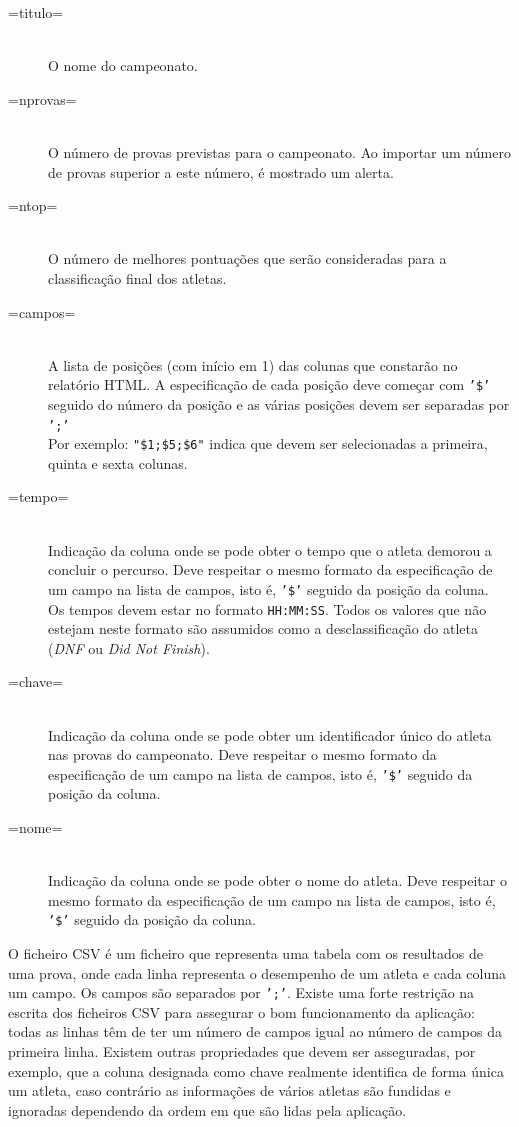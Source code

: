\documentclass[11pt, a4paper, oneside]{article}
\begin{document}
\begin{description}
\item[=titulo=] \hfill \\
	O nome do campeonato.
\item[=nprovas=] \hfill \\
	O número de provas previstas para o campeonato. Ao importar um número de provas superior a este número, é mostrado um alerta.
\item[=ntop=] \hfill \\
	O número de melhores pontuações que serão consideradas para a classificação final dos atletas.
\item[=campos=] \hfill \\
	A lista de posições (com início em 1) das colunas que constarão no relatório HTML. A especificação de cada posição deve começar com \texttt{'\$'} seguido do número da posição e as várias posições devem ser separadas por \texttt{';'}\\
	Por exemplo: \texttt{"\$1;\$5;\$6"} indica que devem ser selecionadas a primeira, quinta e sexta colunas.
\item[=tempo=] \hfill \\
	Indicação da coluna onde se pode obter o tempo que o atleta demorou a concluir o percurso. Deve respeitar o mesmo formato da especificação de um campo na lista de campos, isto é, \texttt{'\$'} seguido da posição da coluna.\\
	Os tempos devem estar no formato \texttt{HH:MM:SS}. Todos os valores que não estejam neste formato são assumidos como a desclassificação do atleta (\emph{DNF} ou \emph{Did Not Finish}).
\item[=chave=] \hfill \\
	Indicação da coluna onde se pode obter um identificador único do atleta nas provas do campeonato. Deve respeitar o mesmo formato da especificação de um campo na lista de campos, isto é, \texttt{'\$'} seguido da posição da coluna.
\item[=nome=] \hfill \\
	Indicação da coluna onde se pode obter o nome do atleta. Deve respeitar o mesmo formato da especificação de um campo na lista de campos, isto é, \texttt{'\$'} seguido da posição da coluna.
\end{description}

O ficheiro CSV é um ficheiro que representa uma tabela com os resultados de uma prova, onde cada linha representa o desempenho de um atleta e cada coluna um campo. Os campos são separados por \texttt{';'}. Existe uma forte restrição na escrita dos ficheiros CSV para assegurar o bom funcionamento da aplicação: todas as linhas têm de ter um número de campos igual ao número de campos da primeira linha. Existem outras propriedades que devem ser asseguradas, por exemplo, que a coluna designada como chave realmente identifica de forma única um atleta, caso contrário as informações de vários atletas são fundidas e ignoradas dependendo da ordem em que são lidas pela aplicação.
\end{document}
